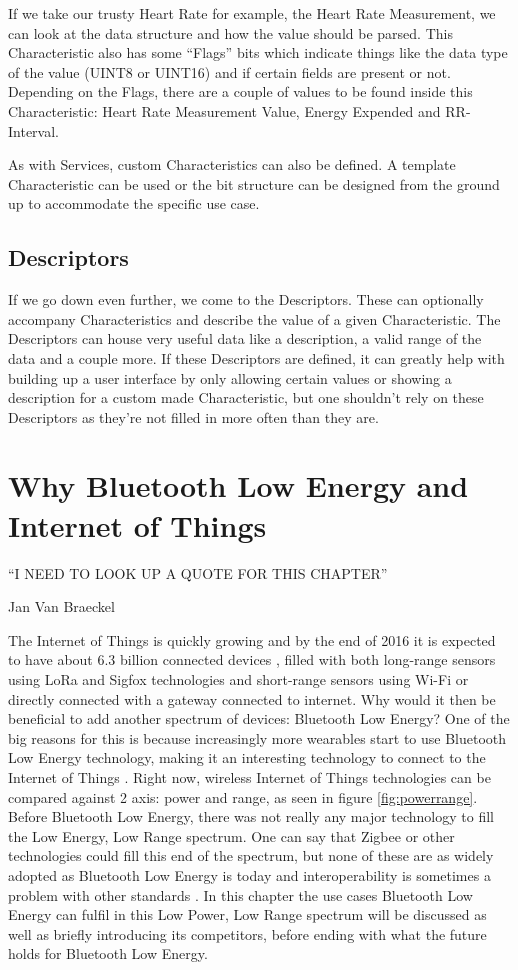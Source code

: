 \documentclass[pdftex,a4paper,12pt,twoside]{report}
\begin{document}
If we take our trusty Heart Rate for example, the Heart Rate Measurement, we can look at the data structure and how the value should be parsed. This Characteristic also has some ``Flags'' bits which indicate things like the data type of the value (UINT8 or UINT16) and if certain fields are present or not. Depending on the Flags, there are a couple of values to be found inside this Characteristic: Heart Rate Measurement Value, Energy Expended and RR-Interval.

As with Services, custom Characteristics can also be defined. A template Characteristic can be used or the bit structure can be designed from the ground up to accommodate the specific use case.

\section{Descriptors}
\label{sec:descriptors}
If we go down even further, we come to the Descriptors. These can optionally accompany Characteristics and describe the value of a given Characteristic. The Descriptors can house very useful data like a description, a valid range of the data and a couple more. If these Descriptors are defined, it can greatly help with building up a user interface by only allowing certain values or showing a description for a custom made Characteristic, but one shouldn't rely on these Descriptors as they're not filled in more often than they are.

\chapter{Why Bluetooth Low Energy and Internet of Things}
\label{ch:BLEIOT}
\epigraph{``I NEED TO LOOK UP A QUOTE FOR THIS CHAPTER''}{Jan Van Braeckel}
The Internet of Things is quickly growing and by the end of 2016 it is expected to have about 6.3 billion connected devices \citep{gartner2015}, filled with both long-range sensors using LoRa and Sigfox technologies and short-range sensors using Wi-Fi or directly connected with a gateway connected to internet. Why would it then be beneficial to add another spectrum of devices: Bluetooth Low Energy? One of the big reasons for this is because increasingly more wearables start to use Bluetooth Low Energy technology, making it an interesting technology to connect to the Internet of Things \citep{wei2014wearables}. Right now, wireless Internet of Things technologies can be compared against 2 axis: power and range, as seen in figure \ref{fig:powerrange}. Before Bluetooth Low Energy, there was not really any major technology to fill the Low Energy, Low Range spectrum. One can say that Zigbee or other technologies could fill this end of the spectrum, but none of these are as widely adopted as Bluetooth Low Energy is today and interoperability is sometimes a problem with other standards \citep{colitti2014}. In this chapter the use cases Bluetooth Low Energy can fulfil in this Low Power, Low Range spectrum will be discussed as well as briefly introducing its competitors, before ending with what the future holds for Bluetooth Low Energy.
\end{document}
